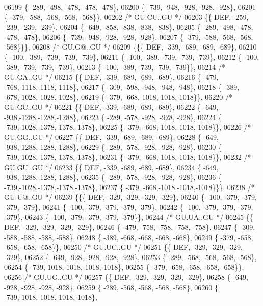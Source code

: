 \begin{DoxyCode}
06199 \{ -289, -498, -478, -478, -478\},
06200 \{ -739, -948, -928, -928, -928\},
06201 \{ -379, -588, -568, -568, -568\}\},
06202 \textcolor{comment}{/* GU.CU..GU */}
06203 \{\{  DEF, -259, -239, -239, -239\},
06204 \{ -649, -858, -838, -838, -838\},
06205 \{ -289, -498, -478, -478, -478\},
06206 \{ -739, -948, -928, -928, -928\},
06207 \{ -379, -588, -568, -568, -568\}\}\},
06208 \textcolor{comment}{/* GU.G@..GU */}
06209 \{\{\{  DEF, -339, -689, -689, -689\},
06210 \{ -100, -389, -739, -739, -739\},
06211 \{ -100, -389, -739, -739, -739\},
06212 \{ -100, -389, -739, -739, -739\},
06213 \{ -100, -389, -739, -739, -739\}\},
06214 \textcolor{comment}{/* GU.GA..GU */}
06215 \{\{  DEF, -339, -689, -689, -689\},
06216 \{ -479, -768,-1118,-1118,-1118\},
06217 \{ -309, -598, -948, -948, -948\},
06218 \{ -389, -678,-1028,-1028,-1028\},
06219 \{ -379, -668,-1018,-1018,-1018\}\},
06220 \textcolor{comment}{/* GU.GC..GU */}
06221 \{\{  DEF, -339, -689, -689, -689\},
06222 \{ -649, -938,-1288,-1288,-1288\},
06223 \{ -289, -578, -928, -928, -928\},
06224 \{ -739,-1028,-1378,-1378,-1378\},
06225 \{ -379, -668,-1018,-1018,-1018\}\},
06226 \textcolor{comment}{/* GU.GG..GU */}
06227 \{\{  DEF, -339, -689, -689, -689\},
06228 \{ -649, -938,-1288,-1288,-1288\},
06229 \{ -289, -578, -928, -928, -928\},
06230 \{ -739,-1028,-1378,-1378,-1378\},
06231 \{ -379, -668,-1018,-1018,-1018\}\},
06232 \textcolor{comment}{/* GU.GU..GU */}
06233 \{\{  DEF, -339, -689, -689, -689\},
06234 \{ -649, -938,-1288,-1288,-1288\},
06235 \{ -289, -578, -928, -928, -928\},
06236 \{ -739,-1028,-1378,-1378,-1378\},
06237 \{ -379, -668,-1018,-1018,-1018\}\}\},
06238 \textcolor{comment}{/* GU.U@..GU */}
06239 \{\{\{  DEF, -329, -329, -329, -329\},
06240 \{ -100, -379, -379, -379, -379\},
06241 \{ -100, -379, -379, -379, -379\},
06242 \{ -100, -379, -379, -379, -379\},
06243 \{ -100, -379, -379, -379, -379\}\},
06244 \textcolor{comment}{/* GU.UA..GU */}
06245 \{\{  DEF, -329, -329, -329, -329\},
06246 \{ -479, -758, -758, -758, -758\},
06247 \{ -309, -588, -588, -588, -588\},
06248 \{ -389, -668, -668, -668, -668\},
06249 \{ -379, -658, -658, -658, -658\}\},
06250 \textcolor{comment}{/* GU.UC..GU */}
06251 \{\{  DEF, -329, -329, -329, -329\},
06252 \{ -649, -928, -928, -928, -928\},
06253 \{ -289, -568, -568, -568, -568\},
06254 \{ -739,-1018,-1018,-1018,-1018\},
06255 \{ -379, -658, -658, -658, -658\}\},
06256 \textcolor{comment}{/* GU.UG..GU */}
06257 \{\{  DEF, -329, -329, -329, -329\},
06258 \{ -649, -928, -928, -928, -928\},
06259 \{ -289, -568, -568, -568, -568\},
06260 \{ -739,-1018,-1018,-1018,-1018\},

\end{DoxyCode}
